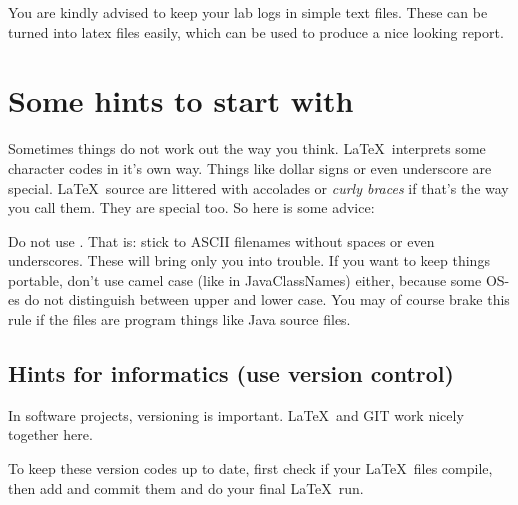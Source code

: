 You are kindly advised to keep your lab logs in simple text
files. These can be turned into latex files easily,
which can be used to produce a nice looking report.
\section{Some hints to start with}
Sometimes things do not work out the way you think.
\LaTeX\ interprets some character codes in it's own way.
Things like dollar signs or even underscore are special.
\LaTeX\ source are littered with accolades or \textit{curly braces} if that's
the way you call them. They are special too. So here is some advice: 

Do not use . That is: stick to ASCII filenames without spaces or even underscores. 
These will bring only you into trouble. If you want to keep things portable, 
don't use camel case (like in JavaClassNames) either, because
some OS-es do not distinguish between upper and lower case. You may of
course brake this rule if the files are program things like
Java source files.

\subsection{Hints for informatics (use version control)}
In software projects, versioning is important. \LaTeX\ and \textsc{GIT}
work nicely together here.

To keep these version codes up to date, first check if your \LaTeX\  files compile,
then add and commit them and do your final \LaTeX\  run. 


